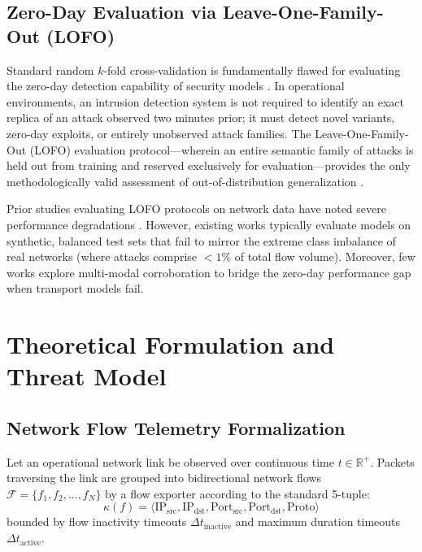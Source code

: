 \documentclass[conference]{IEEEtran}
\begin{document}
\subsection{Zero-Day Evaluation via Leave-One-Family-Out (LOFO)}
Standard random $k$-fold cross-validation is fundamentally flawed for evaluating the zero-day detection capability of security models \cite{thorne2023evaluating}. In operational environments, an intrusion detection system is not required to identify an exact replica of an attack observed two minutes prior; it must detect novel variants, zero-day exploits, or entirely unobserved attack families. The Leave-One-Family-Out (LOFO) evaluation protocol---wherein an entire semantic family of attacks is held out from training and reserved exclusively for evaluation---provides the only methodologically valid assessment of out-of-distribution generalization \cite{verkerken2022towards}.

Prior studies evaluating LOFO protocols on network data have noted severe performance degradations \cite{nwakanma2023generalization}. However, existing works typically evaluate models on synthetic, balanced test sets that fail to mirror the extreme class imbalance of real networks (where attacks comprise $<1\%$ of total flow volume). Moreover, few works explore multi-modal corroboration to bridge the zero-day performance gap when transport models fail.

\section{Theoretical Formulation and Threat Model}

\subsection{Network Flow Telemetry Formalization}
Let an operational network link be observed over continuous time $t \in \mathbb{R}^+$. Packets traversing the link are grouped into bidirectional network flows $\mathcal{F} = \{f_1, f_2, \dots, f_N\}$ by a flow exporter according to the standard 5-tuple:
\begin{equation}
\kappa(f) = \langle \text{IP}_{\text{src}}, \text{IP}_{\text{dst}}, \text{Port}_{\text{src}}, \text{Port}_{\text{dst}}, \text{Proto} \rangle
\end{equation}
bounded by flow inactivity timeouts $\Delta t_{\text{inactive}}$ and maximum duration timeouts $\Delta t_{\text{active}}$. 
\end{document}
